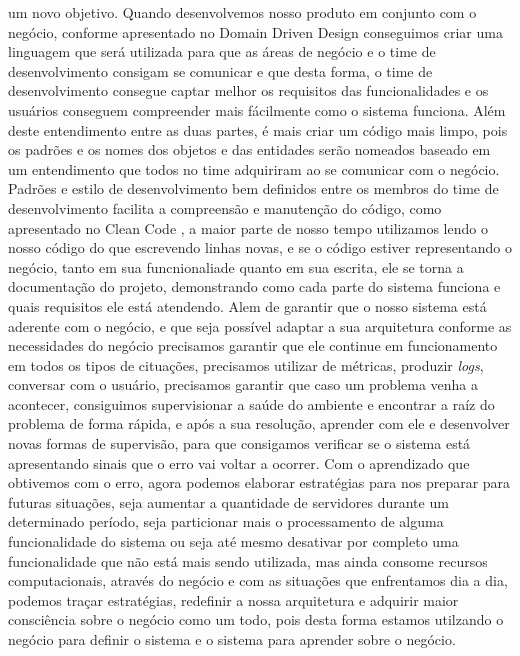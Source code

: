     um novo objetivo. \newline
    Quando desenvolvemos nosso produto em conjunto com o negócio, conforme apresentado
    no Domain Driven Design \cite{DomainDrivenDesign} conseguimos criar uma linguagem
    que será utilizada para que as áreas de negócio e o time de desenvolvimento
    consigam se comunicar e que desta forma, o time de desenvolvimento consegue
    captar melhor os requisitos das funcionalidades e os usuários conseguem
    compreender mais fácilmente como o sistema funciona. Além deste entendimento
    entre as duas partes, é mais criar um código mais limpo, pois os padrões e os
    nomes dos objetos e das entidades serão nomeados baseado em um entendimento
    que todos no time adquiriram ao se comunicar com o negócio. Padrões e estilo de
    desenvolvimento bem definidos entre os membros do time de desenvolvimento facilita
    a compreensão e manutenção do código, como apresentado no Clean Code \cite{CleanCode},
    a maior parte de nosso tempo utilizamos lendo o nosso código do que escrevendo
    linhas novas, e se o código estiver representando o negócio, tanto em sua
    funcnionaliade quanto em sua escrita, ele se torna a documentação do projeto,
    demonstrando como cada parte do sistema funciona e quais requisitos ele está
    atendendo. \newline
    Alem de garantir que o nosso sistema está aderente com o negócio, e que seja
    possível adaptar a sua arquitetura conforme as necessidades do negócio precisamos
    garantir que ele continue em funcionamento em todos os tipos de cituações,
    precisamos utilizar de métricas, produzir \textit{logs}, conversar com o usuário,
    precisamos garantir que caso um problema venha a acontecer, consiguimos supervisionar
    a saúde do ambiente e encontrar a raíz do problema de forma rápida, e após a
    sua resolução, aprender com ele e desenvolver novas formas de supervisão, para
    que consigamos verificar se o sistema está apresentando sinais que o erro vai
    voltar a ocorrer. Com o aprendizado que obtivemos com o erro, agora podemos
    elaborar estratégias para nos preparar para futuras situações, seja aumentar
    a quantidade de servidores durante um determinado período, seja particionar
    mais o processamento de alguma funcionalidade do sistema ou seja até mesmo
    desativar por completo uma funcionalidade que não está mais sendo utilizada,
    mas ainda consome recursos computacionais, através do negócio e com as situações
    que enfrentamos dia a dia, podemos traçar estratégias, redefinir a nossa
    arquitetura e adquirir maior consciência sobre o negócio como um todo, pois
    desta forma estamos utilzando o negócio para definir o sistema e o sistema
    para aprender sobre o negócio.
